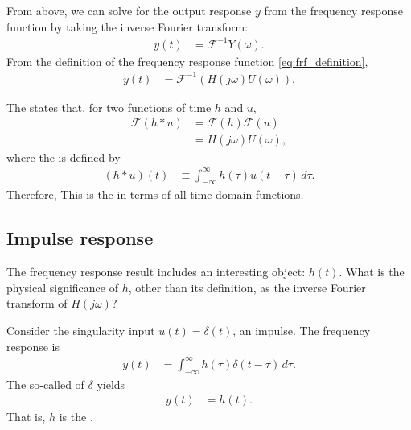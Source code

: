 \documentclass[dynamic_systems.tex]{subfiles}
\begin{document}
From above, we can solve for the output response $y$ from the frequency response function by taking the inverse Fourier transform:
\tags{}
\begin{align}
	y(t) &= \mathcal{F}^{-1}Y(\omega).
\end{align}
From the definition of the frequency response function \eqref{eq:frf_definition}, 
\begin{align}
	y(t) &= \mathcal{F}^{-1}(H(j\omega) U(\omega)).
\end{align}

The  states that, for two functions of time $h$ and $u$,
\tags{}
\begin{subequations}
\begin{align}
	\mathcal{F}(h*u) &= \mathcal{F}(h) \mathcal{F}(u)\\
	&= H(j\omega) U(\omega), \label{eq:conv_01}
\end{align}
\end{subequations}
where the  is defined by
\begin{align}
	\label{eq:conv_02}
	(h*u)(t) &\equiv \int_{-\infty}^\infty h(\tau) u(t-\tau)\, d\tau.
\end{align}
Therefore,
This is the  in terms of all time-domain functions.

\subsection{Impulse response}
\tags{}

The frequency response result includes an interesting object: $h(t)$. What is the physical significance of $h$, other than its definition, as the inverse Fourier transform of $H(j\omega)$?
\tags{}

Consider the singularity input $u(t) = \delta(t)$, an impulse.
The frequency response is
\tags{}
\begin{align}
	y(t) &= \int_{-\infty}^\infty h(\tau) \delta(t-\tau)\, d\tau.
\end{align}
The so-called  of $\delta$ yields
\begin{align}
	y(t) &= h(t).
\end{align}
That is, $h$ is the .
\end{document}
